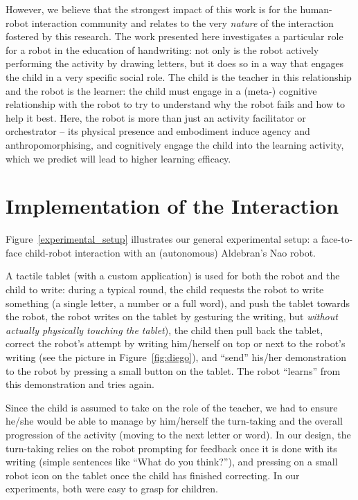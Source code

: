 \documentclass{article}
\begin{document}
However, we believe that the strongest impact of this work is for the
human-robot interaction community and relates to the very \emph{nature} of the
interaction fostered by this research. The work presented here investigates a
particular role for a robot in the education of handwriting: not only is the
robot actively performing the activity by drawing letters, but it does so in a
way that engages the child in a very specific social role. The child is the
teacher in this relationship and the robot is the learner: the child must engage
in a (meta-) cognitive relationship with the robot to try to understand why the
robot fails and how to help it best.  Here, the robot is more than just an
activity facilitator or orchestrator -- its physical presence and embodiment
induce agency and anthropomorphising, and cognitively engage the child into the
learning activity, which we predict will lead to higher learning efficacy.



\section{Implementation of the Interaction}

Figure~\ref{experimental_setup} illustrates our general experimental setup: a
face-to-face child-robot interaction with an (autonomous) Aldebran's Nao robot.

A tactile tablet (with a custom application) is used for both the robot and the
child to write: during a typical round, the child requests the robot to write
something (a single letter, a number or a full word), and push the tablet
towards the robot, the robot writes on the tablet by gesturing the writing, but
\emph{without actually physically touching the tablet}), the child then pull
back the tablet, correct the robot's attempt by writing him/herself on top or
next to the robot's writing (see the picture in Figure~\ref{fig:diego}), and
``send'' his/her demonstration to the robot by pressing a small button on the
tablet. The robot ``learns'' from this demonstration and tries again.

Since the child is assumed to take on the role of the teacher, we had to ensure
he/she would be able to manage by him/herself the turn-taking and the overall
progression of the activity (moving to the next letter or word). In our design,
the turn-taking relies on the robot prompting for feedback once it is done with
its writing (simple sentences like ``What do you think?''), and pressing on a
small robot icon on the tablet once the child has finished correcting. In our
experiments, both were easy to grasp for children.
\end{document}
